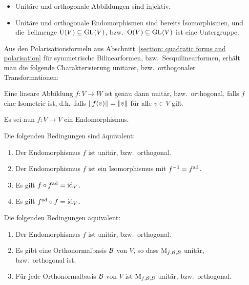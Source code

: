 \begin{lemma}
  \label{lemma: properties of unitary and orthogonal transformations}
  \begin{itemize}
    \item
      Unitäre und orthogonale Abbildungen sind injektiv.
    \item
      Unitäre und orthogonale Endomorphismen sind bereits Isomorphismen, und die Teilmenge $\operatorname{U}(V) \subseteq \operatorname{GL}_{}(V)$, bzw.\ $\operatorname{O}(V) \subseteq \operatorname{GL}_{}(V)$ ist eine Untergruppe.
  \end{itemize}
\end{lemma}

Aus den Polarisationsformeln aus Abschnitt~\ref{section: quadratic forms and polarisation} für symmetrische Bilinearformen, bzw.\ Sesquilinearformen, erhält man die folgende Charakterisierung unitärer, bzw.\ orthogonaler Transformationen:

\begin{lemma}
  Eine lineare Abbildung $f \colon V \to W$ ist genau dann unitär, bzw.\ orthogonal, falls $f$ eine Isometrie ist, d.h.\ falls $\left\|  f(v)  \right\| = \left\| v \right\|$ für alle $v \in V$ gilt.
\end{lemma}

Es sei nun $f \colon V \to V$ ein Endomorphismus.

\begin{lemma}
  Die folgenden Bedingungen sind äquivalent:
  \begin{enumerate}
    \item
      Der Endomorphismus $f$ ist unitär, bzw.\ orthogonal.
    \item
      Der Endomorphismus $f$ ist ein Isomorphismus mit $f^{-1} = f^{\operatorname{ad}}$.
    \item
      Es gilt $f \circ f^{\operatorname{ad}} = \operatorname{id}_V$.
    \item
      Es gilt $f^{\operatorname{ad}} \circ f = \operatorname{id}_V$.
  \end{enumerate}
\end{lemma}

\begin{lemma}
  Die folgenden Bedingungen äquivalent:
  \begin{enumerate}
    \item
      Der Endomorphismus $f$ ist unitär, bzw.\ orthogonal.
    \item
      Es gibt eine Orthonormalbasis $\mathcal{B}$ von $V$, so dass $\operatorname{M}_{f, \mathcal{B}, \mathcal{B}}$ unitär, bzw.\ orthogonal ist.
    \item
      Für jede Orthonormalbasis $\mathcal{B}$ von $V$ ist $\operatorname{M}_{f, \mathcal{B}, \mathcal{B}}$ unitär, bzw.\ orthogonal.
  \end{enumerate}
\end{lemma}




